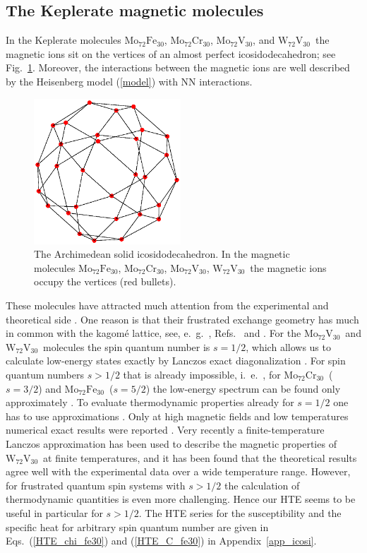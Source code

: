 \documentclass[aps,twocolumn,groupedaddress]{revtex4}
\newcommand {\mofe} {$\textrm{Mo}_{72}\textrm{Fe}_{30}$}
\newcommand {\mocr} {$\textrm{Mo}_{72}\textrm{Cr}_{30}$}
\newcommand {\mov} {$\textrm{Mo}_{72}\textrm{V}_{30}$}
\newcommand {\wv} {$\textrm{W}_{72}\textrm{V}_{30}$}
\begin{document}
\subsection{The Keplerate magnetic molecules
}
In the Keplerate molecules \mofe, \mocr, \mov, and \wv\
the magnetic ions sit on the vertices of an almost perfect
icosidodecahedron\cite{muller2001,olli2005,Cr30,M_W_V30}; see Fig.~\ref{icosi}.
Moreover, the interactions between the magnetic ions are well described by
the Heisenberg model (\ref{model}) with NN interactions.
\begin{figure}[ht!]
\centering
\includegraphics*[clip,width=55mm]{Ico.eps}
\caption{The  Archimedean solid icosidodecahedron. In the magnetic molecules
\mofe, \mocr, \mov, \wv\  the magnetic ions occupy the vertices  (red
bullets).
}
\label{icosi}
\end{figure}
These molecules  have attracted much attention from the
experimental \cite{muller2001,olli2005,olli2007,Cr30,fe30_exp_clas_MC,M_W_V30} and
theoretical
side \cite{wir,fe30_spectrum,olli2007,fe30_exp_clas_MC,MC_clas,high_field,finite_T_lanc_a,finite_T_lanc_b}.
One reason is that their frustrated exchange
geometry has much in common
with the kagom\'e lattice, see, e.~g.~, Refs.~ and .
For the \mov\ and \wv\ molecules the spin quantum number is $s=1/2$, which allows us
to calculate low-energy states  exactly by Lanczos exact diagonalization
\cite{wir}. For spin quantum numbers $s>1/2$ that is already impossible,
i.~e.~, for
  \mocr\ ($s=3/2$) and  \mofe\  ($s=5/2$) the low-energy spectrum can be
found only approximately \cite{fe30_spectrum,olli2007}.
To evaluate thermodynamic properties already for $s=1/2$ one has to use
approximations \cite{finite_T_lanc_a,finite_T_lanc_b}. Only at  high magnetic fields
and low temperatures numerical exact results were reported \cite{high_field}.
Very recently a finite-temperature Lanczos approximation has been
used \cite{finite_T_lanc_b} to
describe the magnetic properties
of \wv\ at finite temperatures, and it has been found that  the theoretical results agree
well with the experimental data over a wide temperature range.
However, for frustrated quantum spin systems with $s>1/2$ the calculation
of thermodynamic quantities is even more challenging. Hence our HTE seems
to be useful in particular for $s> 1/2$.
The HTE series for the susceptibility and the specific heat for arbitrary
spin quantum number are given in Eqs.~(\ref{HTE_chi_fe30}) and
(\ref{HTE_C_fe30}) in Appendix~\ref{app_icosi}.
\end{document}
